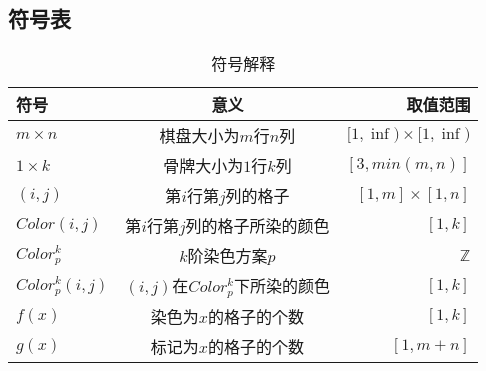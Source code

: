 \subsection{符号表}
\begin{table}[htbp]
    \centering
    \caption{符号解释}
    \begin{tabular}{lcr}
        \toprule
        符号                & 意义                         & 取值范围                          \\
        \midrule
        $m \times n$      & 棋盘大小为$m$行$n$列              & $[1, \inf) \times [1, \inf) $ \\
        $1 \times k $     & 骨牌大小为$1$行$k$列              & $[3, min(m, n)]$              \\
        $(i, j)$          & 第$i$行第$j$列的格子              & $[1, m] \times [1, n]$        \\
        $Color(i, j)$     & 第$i$行第$j$列的格子所染的颜色         & $[1, k]$                      \\
        $Color^k_p$       & $k$阶染色方案$p$                & $\mathbb{Z}$                  \\
        $Color^k_p(i, j)$ & $(i, j)$在$Color^k_p$下所染的颜色 & $[1, k]$                      \\
        $f(x)$            & 染色为$x$的格子的个数               & $[1, k]$                      \\
        $g(x)$            & 标记为$x$的格子的个数               & $[1, m + n]$                  \\
        \bottomrule
    \end{tabular}
\end{table}